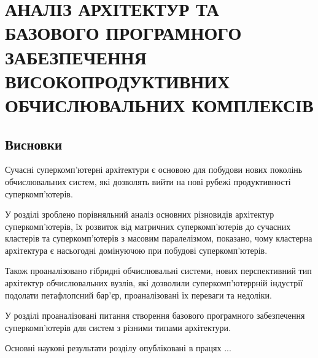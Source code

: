 \chapter{АНАЛІЗ АРХІТЕКТУР ТА БАЗОВОГО ПРОГРАМНОГО ЗА\-БЕЗ\-ПЕ\-ЧЕН\-НЯ ВИСОКОПРОДУКТИВНИХ ОБЧИСЛЮВАЛЬНИХ КОМ\-ПЛЕ\-КСІВ}


\section{Висновки}

Сучасні суперкомп'ютерні архітектури є основою для побудови нових поколінь обчислювальних систем, які дозволять вийти на нові рубежі продуктивності суперкомп'ютерів.

У розділі зроблено порівняльний аналіз основних різновидів архітектур суперкомп'ютерів, їх розвиток від матричних суперкомп'ютерів до сучасних кластерів та суперкомп'ютерів з масовим паралелізмом, показано, чому кластерна архітектура є насьогодні домінуючою при побудові суперкомп'ютерів.

Також проаналізовано гібридні обчислювальні системи, нових перспективний тип архітектур обчислювальних вузлів, які дозволили суперкомп'ютеррній індустрії подолати петафлопсний бар'єр, проаналізовані їх переваги та недоліки.

У розділі проаналізовані питання створення базового програмного забезпечення суперкомп'ютерів для систем з різними типами архітектури. 


Основні наукові результати розділу опубліковані в працях ...